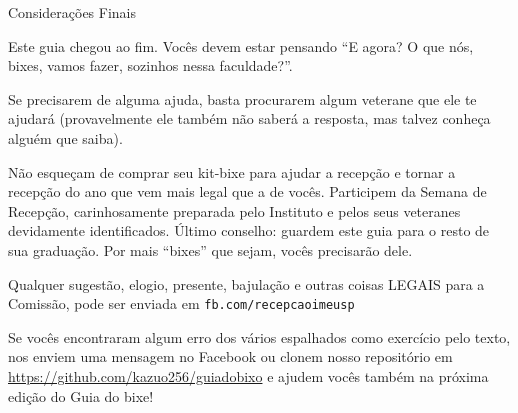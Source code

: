 \begin{secao}{Considerações Finais}

Este guia chegou ao fim. Vocês devem estar pensando ``E agora? O que nós, bixes,
vamos fazer, sozinhos nessa faculdade?''.

Se precisarem de alguma ajuda, basta procurarem algum veterane que ele te
ajudará (provavelmente ele também não saberá a resposta, mas talvez conheça alguém que saiba).

Não esqueçam de comprar seu kit-bixe para ajudar a recepção e tornar a recepção
do ano que vem mais legal que a de vocês. Participem da Semana de Recepção,
carinhosamente preparada pelo Instituto e pelos seus veteranes devidamente
identificados. Último conselho: guardem este guia para o resto de sua graduação.
Por mais ``bixes'' que sejam, vocês precisarão dele.

Qualquer sugestão, elogio, presente, bajulação e outras coisas LEGAIS para a
Comissão, pode ser enviada em {\tt fb.com/recepcaoimeusp}

Se vocês encontraram algum erro dos vários espalhados como exercício pelo texto,
nos enviem uma mensagem no Facebook ou clonem nosso repositório em
\url{https://github.com/kazuo256/guiadobixo} e ajudem vocês também na próxima
edição do Guia do bixe!

\end{secao}
